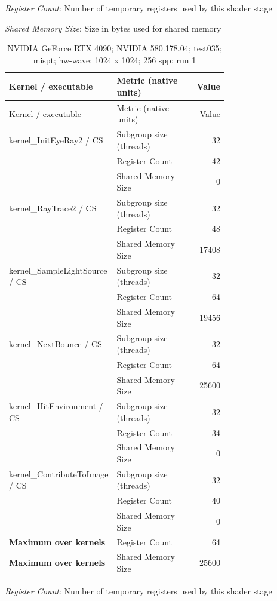 \noindent\textit{Register Count}: Number of temporary registers used by this shader stage\par
\noindent\textit{Shared Memory Size}: Size in bytes used for shared memory\par
\begin{longtable}{p{0.30\linewidth}p{0.43\linewidth}r}
\caption{NVIDIA GeForce RTX 4090; NVIDIA 580.178.04; test035; mispt; hw-wave; 1024 x 1024; 256 spp; run 1}\label{tab:hydra-profile-12}\\
\hline Kernel / executable & Metric (native units) & Value \\\hline
\endfirsthead
\hline Kernel / executable & Metric (native units) & Value \\\hline
\endhead
kernel\_InitEyeRay2 / CS & Subgroup size (threads) & 32 \\
 & Register Count & 42 \\
 & Shared Memory Size & 0 \\
\hline
kernel\_RayTrace2 / CS & Subgroup size (threads) & 32 \\
 & Register Count & 48 \\
 & Shared Memory Size & 17408 \\
\hline
kernel\_SampleLightSource / CS & Subgroup size (threads) & 32 \\
 & Register Count & 64 \\
 & Shared Memory Size & 19456 \\
\hline
kernel\_NextBounce / CS & Subgroup size (threads) & 32 \\
 & Register Count & 64 \\
 & Shared Memory Size & 25600 \\
\hline
kernel\_HitEnvironment / CS & Subgroup size (threads) & 32 \\
 & Register Count & 34 \\
 & Shared Memory Size & 0 \\
\hline
kernel\_ContributeToImage / CS & Subgroup size (threads) & 32 \\
 & Register Count & 40 \\
 & Shared Memory Size & 0 \\
\hline
\textbf{Maximum over kernels} & Register Count & 64 \\
\textbf{Maximum over kernels} & Shared Memory Size & 25600 \\
\hline
\end{longtable}
\noindent\textit{Register Count}: Number of temporary registers used by this shader stage\par
